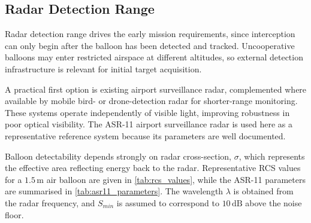 

\subsection*{Radar Detection Range}

Radar detection range drives the early mission requirements, since interception can only begin after the balloon has been detected and tracked. Uncooperative balloons may enter restricted airspace at different altitudes, so external detection infrastructure is relevant for initial target acquisition.

A practical first option is existing airport surveillance radar, complemented where available by mobile bird- or drone-detection radar for shorter-range monitoring. These systems operate independently of visible light, improving robustness in poor optical visibility. The ASR-11 airport surveillance radar is used here as a representative reference system because its parameters are well documented.

Balloon detectability depends strongly on radar cross-section, $\sigma$, which represents the effective area reflecting energy back to the radar. Representative RCS values for a $1.5\,\text{m}$ air balloon are given in \autoref{tab:rcs_values}, while the ASR-11 parameters are summarised in \autoref{tab:asr11_parameters}. The wavelength $\lambda$ is obtained from the radar frequency, and $S_{min}$ is assumed to correspond to $10\,\text{dB}$ above the noise floor.

